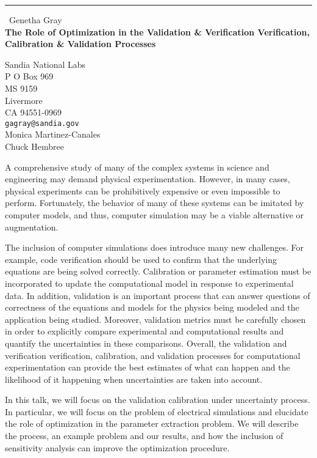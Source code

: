 \documentclass{report}
\begin{document}
\begin{center}
\rule{6in}{1pt} \
{\large Genetha Gray \\
{\bf The Role of Optimization in the Validation & Verification Verification, Calibration & Validation Processes }}

Sandia National Labs \\ P O Box 969 \\ MS 9159 \\ Livermore \\ CA 94551-0969
\\
{\tt gagray@sandia.gov}\\
Monica Martinez-Canales\\
Chuck Hembree\end{center}

A comprehensive study of many of the complex systems in science and
engineering may demand physical experimentation. However, in many cases,
physical experiments can be prohibitively expensive or even impossible to
perform. Fortunately, the behavior of many of these systems can be
imitated by computer models, and thus, computer simulation may be a
viable alternative or augmentation.

The inclusion of computer simulations does introduce many new
challenges. For example, code verification should be used to
confirm that the underlying equations are being solved correctly.
Calibration or parameter estimation must be incorporated to update the
computational model in response to experimental data. In addition,
validation is an important process that can answer questions of
correctness of the equations and models for the physics being modeled and
the application being studied. Moreover, validation metrics must be
carefully chosen in order to explicitly compare experimental and
computational results and quantify the uncertainties in these
comparisons. Overall, the validation and verification verification,
calibration, and validation processes for computational experimentation
can provide the best estimates of what can happen and the likelihood of
it happening when uncertainties are taken into account.

In this talk, we will focus on the validation calibration under
uncertainty process. In particular, we will focus on the problem of
electrical simulations and elucidate the role of optimization in the
parameter extraction problem. We will describe the process, an example
problem and our results, and how the inclusion of sensitivity analysis
can improve the optimization procedure.
\end{document}
